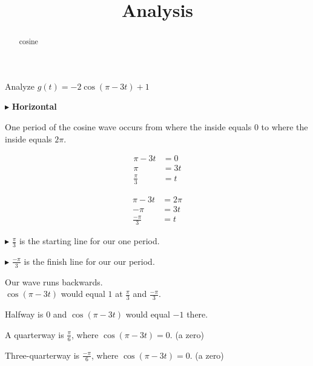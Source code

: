 \documentclass{ximera}
\title{Analysis}
\begin{document}
\begin{abstract}
cosine
\end{abstract}
\maketitle












\begin{example}



Analyze  $g(t) = -2 \cos(\pi - 3t) + 1$


\begin{explanation}

$\blacktriangleright$ \textbf{Horizontal}


One period of the cosine wave occurs from where the inside equals $0$ to where the inside equals $2 \pi$.


\begin{align*}
\pi - 3t  & =  0 \\
\pi       & =  3t \\
\frac{\pi}{3}       & =  t
\end{align*}



\begin{align*}
\pi - 3t  & =  2 \pi \\
-\pi      & =  3t \\
\frac{-\pi}{3}       & =  t
\end{align*}



$\blacktriangleright$ $\frac{\pi}{3}$ is the starting line for our one period.

$\blacktriangleright$ $\frac{-\pi}{3}$ is the finish line for our our period.

Our wave runs backwards. \\




$\cos(\pi - 3t)$ would equal $1$ at $\frac{\pi}{3}$ and $\frac{-\pi}{3}$. 

Halfway is $0$ and $\cos(\pi - 3t)$ would equal $-1$ there.

A quarterway is $\frac{\pi}{6}$, where $\cos(\pi - 3t) = 0$.  (a zero)

Three-quarterway is $\frac{-\pi}{6}$, where $\cos(\pi - 3t) = 0$. (a zero)







\end{explanation}
\end{example}
\end{document}
